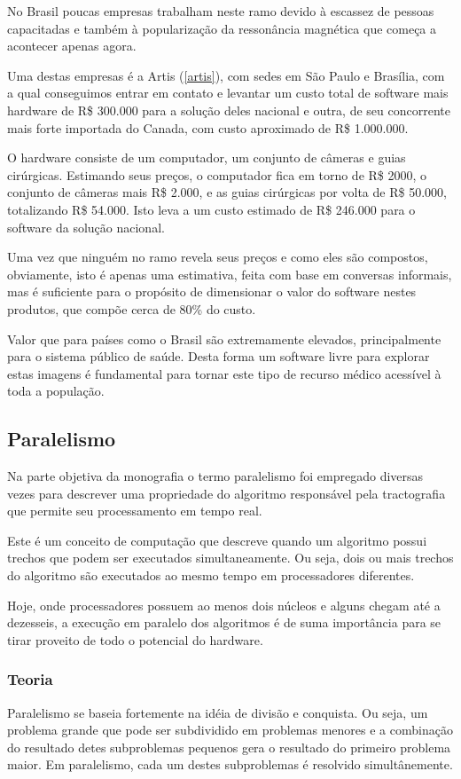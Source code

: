   No Brasil poucas empresas trabalham neste ramo devido à escassez de pessoas capacitadas e também à popularização da ressonância magnética que começa a acontecer apenas agora.
  
  Uma destas empresas é a Artis (\ref{artis}), com sedes em São Paulo e Brasília, com a qual conseguimos entrar em contato e levantar um custo total de software mais hardware de R\$ 300.000 para a solução deles nacional e outra, de seu concorrente mais forte importada do Canada, com custo aproximado de R\$ 1.000.000.
  
  O hardware consiste de um computador, um conjunto de câmeras e guias cirúrgicas. Estimando seus preços, o computador fica em torno de R\$ 2000, o conjunto de câmeras mais R\$ 2.000, e as guias cirúrgicas por volta de R\$ 50.000, totalizando R\$ 54.000. Isto leva a um custo estimado de R\$ 246.000 para o software da solução nacional.
  
  Uma vez que ninguém no ramo revela seus preços e como eles são compostos, obviamente, isto é apenas uma estimativa, feita com base em conversas informais, mas é suficiente para o propósito de dimensionar o valor do software nestes produtos, que compõe cerca de 80\% do custo.
  
  Valor que para países como o Brasil são extremamente elevados, principalmente para o sistema público de saúde. Desta forma um software livre para explorar estas imagens é fundamental para tornar este tipo de recurso médico acessível à toda a população.
  
  \subsection{Paralelismo}
    Na parte objetiva da monografia o termo paralelismo foi empregado diversas vezes para descrever uma propriedade do algoritmo responsável pela tractografia que permite seu processamento em tempo real.
    
    Este é um conceito de computação que descreve quando um algoritmo possui trechos que podem ser executados simultaneamente. Ou seja, dois ou mais trechos do algoritmo são executados ao mesmo tempo em processadores diferentes.
    
    Hoje, onde processadores possuem ao menos dois núcleos e alguns chegam até a dezesseis, a execução em paralelo dos algoritmos é de suma importância para se tirar proveito de todo o potencial do hardware.
  
    \subsubsection{Teoria}
    Paralelismo se baseia fortemente na idéia de divisão e conquista. Ou seja, um problema grande que pode ser subdividido em problemas menores e a combinação do resultado detes subproblemas pequenos gera o resultado do primeiro problema maior. Em paralelismo, cada um destes subproblemas é resolvido simultânemente.
    
